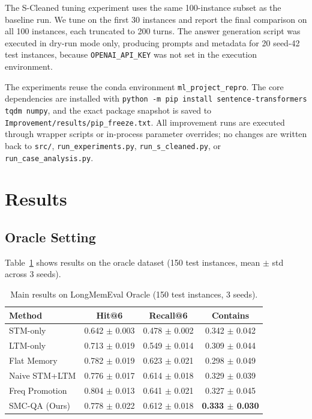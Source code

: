 \documentclass{article}
\begin{document}
The S-Cleaned tuning experiment uses the same 100-instance subset as the baseline run. We tune on the first 30 instances and report the final comparison on all 100 instances, each truncated to 200 turns. The answer generation script was executed in dry-run mode only, producing prompts and metadata for 20 seed-42 test instances, because \texttt{OPENAI\_API\_KEY} was not set in the execution environment.

The experiments reuse the conda environment \texttt{ml\_project\_repro}. The core dependencies are installed with \texttt{python -m pip install sentence-transformers tqdm numpy}, and the exact package snapshot is saved to \texttt{Improvement/results/pip\_freeze.txt}. All improvement runs are executed through wrapper scripts or in-process parameter overrides; no changes are written back to \texttt{src/}, \texttt{run\_experiments.py}, \texttt{run\_s\_cleaned.py}, or \texttt{run\_case\_analysis.py}.

\section{Results}

\subsection{Oracle Setting}

Table~\ref{tab:main} shows results on the oracle dataset (150 test instances, mean $\pm$ std across 3 seeds).

\begin{table}[h]
\centering
\caption{Main results on LongMemEval Oracle (150 test instances, 3 seeds).}
\label{tab:main}
\begin{tabular}{lccc}
\toprule
\textbf{Method} & \textbf{Hit@6} & \textbf{Recall@6} & \textbf{Contains} \\
\midrule
STM-only & 0.642 $\pm$ 0.003 & 0.478 $\pm$ 0.002 & 0.342 $\pm$ 0.042 \\
LTM-only & 0.713 $\pm$ 0.019 & 0.549 $\pm$ 0.014 & 0.309 $\pm$ 0.044 \\
Flat Memory & 0.782 $\pm$ 0.019 & 0.623 $\pm$ 0.021 & 0.298 $\pm$ 0.049 \\
Naive STM+LTM & 0.776 $\pm$ 0.017 & 0.614 $\pm$ 0.018 & 0.329 $\pm$ 0.039 \\
Freq Promotion & 0.804 $\pm$ 0.013 & 0.641 $\pm$ 0.021 & 0.327 $\pm$ 0.045 \\
SMC-QA (Ours) & 0.778 $\pm$ 0.022 & 0.612 $\pm$ 0.018 & \textbf{0.333 $\pm$ 0.030} \\
\bottomrule
\end{tabular}
\end{table}
\end{document}
